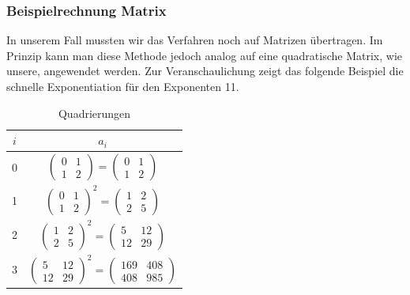 \documentclass[course=erap]{aspdoc}
\begin{document}
    \subsubsection{Beispielrechnung Matrix}\label{Beispielrechnung}
    In unserem Fall mussten wir das Verfahren noch auf Matrizen übertragen. Im Prinzip kann man diese Methode jedoch analog auf eine quadratische Matrix, wie unsere, angewendet werden. Zur Veranschaulichung zeigt das folgende Beispiel die schnelle Exponentiation für den Exponenten 11.
    \begin{table}[ht]\label{Quadrierungen}
    \centering
    \begin{tabular}{c| c}
        $i$ & $a_i$ \\
        \hline
        0 & $\begin{pmatrix}
                 0 & 1 \\
                 1 & 2
        \end{pmatrix} = \begin{pmatrix}
                            0 & 1 \\
                            1 & 2
        \end{pmatrix}$ \\
        \hline
        1 & $\begin{pmatrix}
                 0 & 1 \\
                 1 & 2
        \end{pmatrix}^2 = \begin{pmatrix}
                              1 & 2 \\
                              2 & 5
        \end{pmatrix}$ \\
        \hline
        2 & $\begin{pmatrix}
                 1 & 2 \\
                 2 & 5
        \end{pmatrix}^2 = \begin{pmatrix}
                              5 & 12 \\
                              12 & 29
        \end{pmatrix}$ \\
        \hline
        3 & $\begin{pmatrix}
                 5 & 12 \\
                 12 & 29
        \end{pmatrix}^2 = \begin{pmatrix}
                              169 & 408 \\
                              408 & 985
        \end{pmatrix}$ \\

    \end{tabular}
    \caption{Quadrierungen}
    \end{table}
\end{document}
